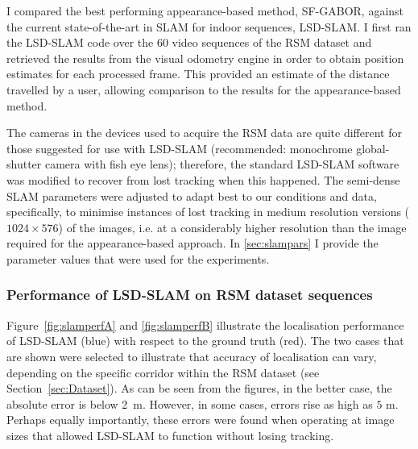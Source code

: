 I compared the best performing appearance-based method, SF-GABOR, against the current state-of-the-art in SLAM for indoor sequences, LSD-SLAM.  I first ran the LSD-SLAM code over the 60 video sequences of the RSM dataset and retrieved the results from the visual odometry engine in order to obtain position estimates for each processed frame.  This provided an estimate of the distance travelled by a user, allowing comparison to the results for the appearance-based method. 

The cameras in the devices used to acquire the RSM data are quite different for those suggested for use with LSD-SLAM (recommended: monochrome global-shutter camera with fish eye lens); therefore, the standard LSD-SLAM software was modified to recover from lost tracking when this happened. The semi-dense SLAM parameters were adjusted to adapt best to our conditions and data, specifically, to minimise instances of lost tracking in medium resolution versions ($1024 \times 576$) of the images, i.e. at a considerably higher resolution than the image required for the appearance-based approach. In \ref{sec:slampars} I provide the parameter values that were used for the experiments.


\subsubsection{Performance of LSD-SLAM on RSM dataset sequences}

Figure~\ref{fig:slamperfA} and \ref{fig:slamperfB} illustrate the localisation performance of LSD-SLAM (blue) with respect to the ground truth (red). The two cases that are shown were selected to illustrate that accuracy of localisation can vary, depending on the specific corridor within the RSM dataset (see Section~\ref{sec:Dataset}). As can be seen from the figures, in the better case, the absolute error is below \SI{2}{\metre}. However, in some cases, errors rise as high as $5$ m. Perhaps equally importantly, these errors were found when operating at image sizes that allowed LSD-SLAM to function without losing tracking.


